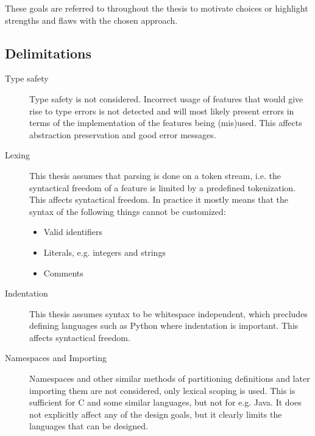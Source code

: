 \documentclass{kththesis}
\begin{document}
These goals are referred to throughout the thesis to motivate choices or highlight strengths and flaws with the chosen approach.

\subsection{Delimitations} \label{sec:delimitations}

\begin{description}
  \item[Type safety] Type safety is not considered. Incorrect usage of features that would give rise to type errors is not detected and will most likely present errors in terms of the implementation of the features being (mis)used. This affects abstraction preservation and good error messages.

  \item[Lexing] This thesis assumes that parsing is done on a token stream, i.e. the syntactical freedom of a feature is limited by a predefined tokenization. This affects syntactical freedom. In practice it mostly means that the syntax of the following things cannot be customized:
  \begin{itemize}
    \item Valid identifiers
    \item Literals, e.g. integers and strings
    \item Comments
  \end{itemize}

  \item[Indentation] This thesis assumes syntax to be whitespace independent, which precludes defining languages such as Python where indentation is important. This affects syntactical freedom.

  \item[Namespaces and Importing] Namespaces and other similar methods of partitioning definitions and later importing them are not considered, only lexical scoping is used. This is sufficient for C and some similar languages, but not for e.g. Java. It does not explicitly affect any of the design goals, but it clearly limits the languages that can be designed.
\end{description}
\end{document}
